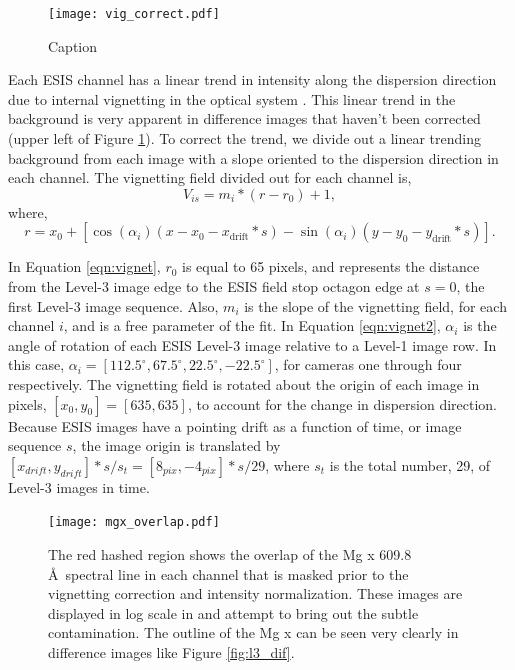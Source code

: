  		\begin{figure}[htb!]
			\centering
			\texttt{[image: vig\_correct.pdf]}
			\caption{Caption}
			\label{fig:vig_correct}
		\end{figure}
	       	
        Each ESIS channel has a linear trend in intensity along the dispersion direction due to internal vignetting in the optical system \citep{ESIS}.
        This linear trend in the background is very apparent in difference images that haven't been corrected (upper left of Figure \ref{fig:vig_correct}).
        To correct the trend, we divide out a linear trending background from each image with a slope oriented to the dispersion direction in each channel.
        The vignetting field divided out for each channel is,
        \begin{equation}
            V_{is} = m_{i} * (r - r_0) + 1,
            \label{eqn:vignet}
        \end{equation}
       	where,
       	\begin{equation}
       		r = x_0 + [\cos(\alpha_i)(x-x_0-x_{\text{drift}}*s) - \sin(\alpha_i)(y-y_0-y_{\text{drift}}*s)].
        	\label{eqn:vignet2}
       	\end{equation}
       	
       	In Equation \ref{eqn:vignet}, $r_0$ is equal to 65 pixels, and represents the distance from the Level-3 image edge to the ESIS field stop octagon edge at $s = 0$, the first Level-3 image sequence.
       	Also, $m_{i}$ is the slope of the vignetting field, for each channel $i$, and is a free parameter of the fit.
        In Equation \ref{eqn:vignet2},  $\alpha_i$ is the angle of rotation of each ESIS Level-3 image relative to a Level-1 image row.
        In this case, $\alpha_i = [112.5^{\circ}, 67.5^{\circ}, 22.5^{\circ}, -22.5^{\circ}]$, for cameras one through four respectively.
        The vignetting field is rotated about the origin of each image in pixels, $[x_0, y_0] = [635,635]$, to account for the change in dispersion direction.
        Because ESIS images have a pointing drift as a function of time, or image sequence $s$, the image origin is translated by $[x_{drift},y_{drift}]*s/s_t = [8_{pix},-4_{pix}]*s/29$, where $s_t $ is the total number, 29, of Level-3 images in time.
        
        \begin{figure}[htb!]
        	\centering
        	\texttt{[image: mgx\_overlap.pdf]}
        	\caption{The red hashed region shows the overlap of the Mg {\sc x} 609.8 \AA \ spectral line in each channel that is masked prior to the vignetting correction and intensity normalization. These images are displayed in log scale in and attempt to bring out the subtle contamination.  The outline of the Mg {\sc x} can be seen very clearly in difference images like Figure \ref{fig:l3_dif}. }

        	\label{fig:mgx_overlap}
        \end{figure}
        

